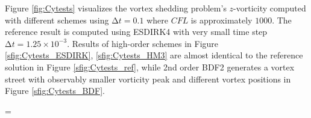 \documentclass[10pt]{article}
\newcommand{\inc}{\mathrm\Delta}
\begin{document}
Figure \ref{fig:Cytests} visualizes the vortex shedding problem's $z$-vorticity computed with different schemes using $\inc t = 0.1$ where $CFL$ is 
approximately $1000$. 
The reference 
result is computed using ESDIRK4 with very small time step $\inc t = 1.25\times10^{-3}$.
Results of high-order schemes in Figure \ref{sfig:Cytests_ESDIRK}, \ref{sfig:Cytests_HM3}
are almost identical to the reference solution in Figure \ref{sfig:Cytests_ref}, 
while 2nd order BDF2 generates a vortex street with observably smaller vorticity peak and 
different vortex positions in Figure \ref{sfig:Cytests_BDF}.




\bibspacing=


\end{document}
